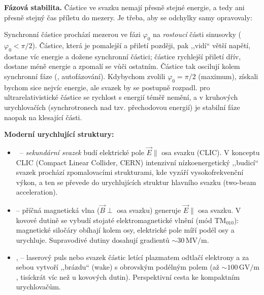 \textbf{Fázová stabilita.} Částice ve svazku nemají přesně stejné energie, a tedy ani
přesně stejný čas příletu do mezery. Je třeba, aby se odchylky samy opravovaly:

\begin{center}
\end{center}

Synchronní částice prochází mezerou ve fázi \(\varphi_0\) na \emph{rostoucí} části sinusovky
(\(\varphi_0<\pi/2\)). Částice, která je pomalejší a přiletí později, pak ,,vidí`` větší
napětí, dostane víc energie a dožene synchronní částici; částice rychlejší přiletí dřív,
dostane méně energie a zpomalí se vůči ostatním. Částice tak oscilují kolem synchronní fáze
(, autofázování). Kdybychom zvolili \(\varphi_0=\pi/2\) (maximum), získali
bychom sice nejvíc energie, ale svazek by se postupně rozpadl.
 pro ultrarelativistické částice se rychlost s energií téměř nemění, a v
kruhových urychlovačích (synchrotronech nad tzv. přechodovou energií) je stabilní fáze naopak
na klesající části.

\textbf{Moderní urychlující struktury:}
\begin{itemize}
  \item {}\, --
        \emph{sekundární svazek} budí elektrické pole \(\vec E\parallel\) osa svazku (CLIC).
        V konceptu CLIC (Compact Linear Collider, CERN) intenzivní nízkoenergetický ,,budicí``
        svazek prochází zpomalovacími strukturami, kde vyzáří vysokofrekvenční výkon, a ten se
        převede do urychlujících struktur hlavního svazku (two-beam acceleration).
  \item {} -- příčná magnetická vlna (\(\vec B\perp\) osa svazku) generuje
        \(\vec E\parallel\) osa svazku. V kovové dutině se vybudí stojaté elektromagnetické vlnění
        (mód \(\mathrm{TM}_{010}\)): magnetické siločáry obíhají kolem osy, elektrické pole míří
        podél osy a urychluje. Supravodivé dutiny dosahují gradientů \(\sim 30\,\mathrm{MV/m}\).
  \item {},  -- laserový puls nebo svazek částic
        letící plazmatem odtlačí elektrony a za sebou vytvoří ,,brázdu`` (wake) s obrovským
        podélným polem (až \(\sim 100\,\mathrm{GV/m}\), tisíckrát víc než u kovových dutin).
        Perspektivní cesta ke kompaktním urychlovačům.
\end{itemize}

